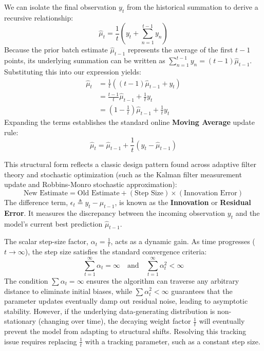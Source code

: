 \documentclass{article}
\begin{document}
We can isolate the final observation $y_t$ from the historical summation to derive a recursive relationship:
\begin{equation}
\hat{\mu}_t = \frac{1}{t} \left( y_t + \sum_{n=1}^{t-1} y_n \right)
\end{equation}
Because the prior batch estimate $\hat{\mu}_{t-1}$ represents the average of the first $t-1$ points, its underlying summation can be written as $\sum_{n=1}^{t-1} y_n = (t-1)\hat{\mu}_{t-1}$. Substituting this into our expression yields:
\begin{align}
\hat{\mu}_t &= \frac{1}{t} \left( (t-1)\hat{\mu}_{t-1} + y_t \right) \\
&= \frac{t-1}{t}\hat{\mu}_{t-1} + \frac{1}{t}y_t \\
&= \left(1 - \frac{1}{t}\right)\hat{\mu}_{t-1} + \frac{1}{t}y_t
\end{align}
Expanding the terms establishes the standard online \textbf{Moving Average} update rule:
\begin{equation}
\hat{\mu}_t = \hat{\mu}_{t-1} + \frac{1}{t}\left(y_t - \hat{\mu}_{t-1}\right)
\end{equation}

This structural form reflects a classic design pattern found across adaptive filter theory and stochastic optimization (such as the Kalman filter measurement update and Robbins-Monro stochastic approximation):
\begin{equation}
\text{New Estimate} = \text{Old Estimate} + \left(\text{Step Size}\right) \times \left(\text{Innovation Error}\right)
\end{equation}
The difference term, $\epsilon_t \triangleq y_t - \hat{\mu}_{t-1}$, is known as the \textbf{Innovation} or \textbf{Residual Error}. It measures the discrepancy between the incoming observation $y_t$ and the model's current best prediction $\hat{\mu}_{t-1}$. 

The scalar step-size factor, $\alpha_t = \frac{1}{t}$, acts as a dynamic gain. As time progresses ($t \to \infty$), the step size satisfies the standard convergence criteria:
\begin{equation}
\sum_{t=1}^{\infty} \alpha_t = \infty \quad \text{and} \quad \sum_{t=1}^{\infty} \alpha_t^2 < \infty
\end{equation} 
The condition $\sum \alpha_t = \infty$ ensures the algorithm can traverse any arbitrary distance to eliminate initial biases, while $\sum \alpha_t^2 < \infty$ guarantees that the parameter updates eventually damp out residual noise, leading to asymptotic stability. However, if the underlying data-generating distribution is non-stationary (changing over time), the decaying weight factor $\frac{1}{t}$ will eventually prevent the model from adapting to structural shifts. Resolving this tracking issue requires replacing $\frac{1}{t}$ with a tracking parameter, such as a constant step size.
\end{document}
